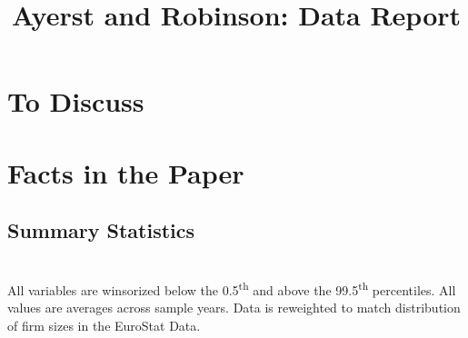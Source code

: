 \documentclass[12pt,notitlepage]{article}
\title{Ayerst and Robinson: Data Report}
\author{}
\date{}
\begin{document}
\maketitle
\tableofcontents
\listoffigures
\FloatBarrier

\section{To Discuss} %
\label{sec:To_Discuss}



\section{Facts in the Paper} %
\label{sec:paper}


\FloatBarrier
\subsection{Summary Statistics} %
\label{sec:summary_statistics}
\FloatBarrier

\begin{table}[!htpb]
\caption{French Summary Statistics}
\tabularnewline \\
All variables are winsorized below the 0.5\textsuperscript{th} and above the 99.5\textsuperscript{th} percentiles. All values are averages across sample years. Data is reweighted to match distribution of firm sizes in the EuroStat Data.
\end{table}
\end{document}
